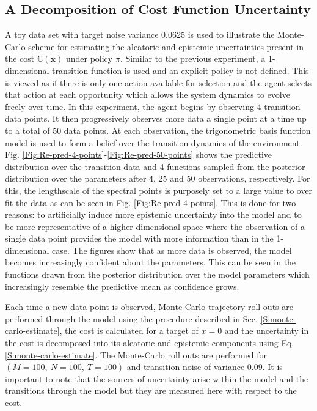 \subsection{A Decomposition of Cost Function Uncertainty}
A toy data set with target noise variance 0.0625 is used to illustrate the Monte-Carlo scheme for estimating the aleatoric and epistemic uncertainties present in the cost $\mathbb{C}(\mathbf{x})$ under policy $\pi$. Similar to the previous experiment, a 1-dimensional transition function is used and an explicit policy is not defined. This is viewed as if there is only one action available for selection and the agent selects that action at each opportunity which allows the system dynamics to evolve freely over time. In this experiment, the agent begins by observing 4 transition data points. It then progressively observes more data a single point at a time up to a total of 50 data points. At each observation, the trigonometric basis function model is used to form a belief over the transition dynamics of the environment. Fig. \ref{Fig:Re-pred-4-points}-\ref{Fig:Re-pred-50-points} shows the predictive distribution over the transition data and 4 functions sampled from the posterior distribution over the parameters after 4, 25 and 50 observations, respectively. For this, the lengthscale of the spectral points is purposely set to a large value to over fit the data as can be seen in Fig. \ref{Fig:Re-pred-4-points}. This is done for two reasons: to artificially induce more epistemic uncertainty into the model and to be more representative of a higher dimensional space where the observation of a single data point provides the model with more information than in the 1-dimensional case. The figures show that as more data is observed, the model becomes increasingly confident about the parameters. This can be seen in the functions drawn from the posterior distribution over the model parameters which increasingly resemble the predictive mean as confidence grows. 

Each time a new data point is observed, Monte-Carlo trajectory roll outs are performed through the model using the procedure described in Sec. \ref{S:monte-carlo-estimate}, the cost is calculated for a target of $x=0$ and the uncertainty in the cost is decomposed into its aleatoric and epistemic components using Eq. \ref{S:monte-carlo-estimate}. The Monte-Carlo roll outs are performed for $(M=100,\: N=100,\: T=100)$ and transition noise of variance 0.09. It is important to note that the sources of uncertainty arise within the model and the transitions through the model but they are measured here with respect to the cost. 

